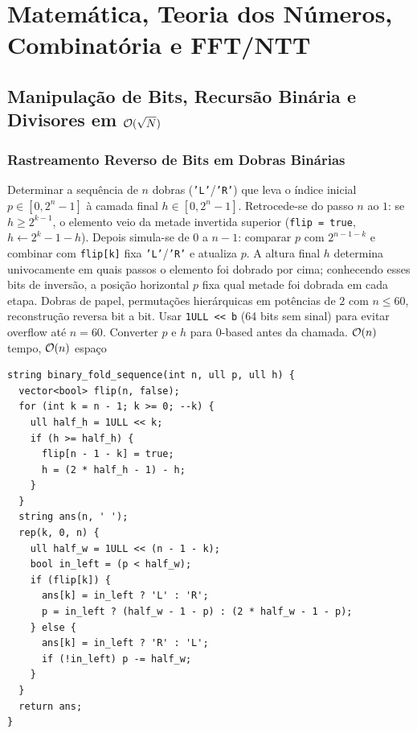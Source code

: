 \section{Matemática, Teoria dos Números, Combinatória e FFT/NTT}

\subsection{Manipulação de Bits, Recursão Binária e Divisores em $\mathcal{O}(\sqrt{N})$}

\subsubsection{Rastreamento Reverso de Bits em Dobras Binárias}
\algobox
  {Determinar a sequência de $n$ dobras (\texttt{'L'}/\texttt{'R'}) que leva o índice inicial $p \in [0, 2^n - 1]$ à camada final $h \in [0, 2^n - 1]$.}
  {Retrocede-se do passo $n$ ao $1$: se $h \ge 2^{k-1}$, o elemento veio da metade invertida superior (\texttt{flip = true}, $h \leftarrow 2^k - 1 - h$). Depois simula-se de $0$ a $n-1$: comparar $p$ com $2^{n-1-k}$ e combinar com \texttt{flip[k]} fixa \texttt{'L'}/\texttt{'R'} e atualiza $p$.}
  {A altura final $h$ determina univocamente em quais passos o elemento foi dobrado por cima; conhecendo esses bits de inversão, a posição horizontal $p$ fixa qual metade foi dobrada em cada etapa.}
  {Dobras de papel, permutações hierárquicas em potências de $2$ com $n \le 60$, reconstrução reversa bit a bit.}
  {Usar \texttt{1ULL << b} (64 bits sem sinal) para evitar overflow até $n = 60$. Converter $p$ e $h$ para 0-based antes da chamada.}
  {$\mathcal{O}(n)$ tempo, $\mathcal{O}(n)$ espaço}

\begin{lstlisting}
string binary_fold_sequence(int n, ull p, ull h) {
  vector<bool> flip(n, false);
  for (int k = n - 1; k >= 0; --k) {
    ull half_h = 1ULL << k;
    if (h >= half_h) {
      flip[n - 1 - k] = true;
      h = (2 * half_h - 1) - h;
    }
  }
  string ans(n, ' ');
  rep(k, 0, n) {
    ull half_w = 1ULL << (n - 1 - k);
    bool in_left = (p < half_w);
    if (flip[k]) {
      ans[k] = in_left ? 'L' : 'R';
      p = in_left ? (half_w - 1 - p) : (2 * half_w - 1 - p);
    } else {
      ans[k] = in_left ? 'R' : 'L';
      if (!in_left) p -= half_w;
    }
  }
  return ans;
}
\end{lstlisting}


